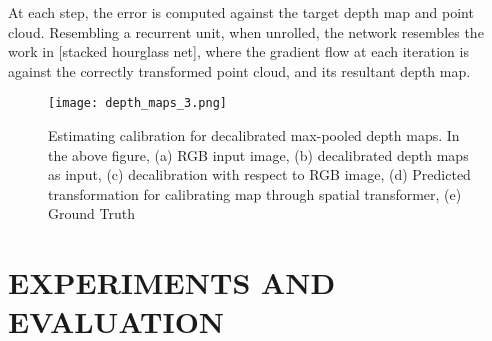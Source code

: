 \documentclass[letterpaper, 10 pt, conference]{ieeeconf}  %
\begin{document}
At each step, the error is computed against the target depth map and point cloud. Resembling a recurrent unit, when unrolled, the network resembles the work in [stacked hourglass net], where the gradient flow at each iteration is against the correctly transformed point cloud, and its resultant depth map. 

\begin{figure*}
\begin{center}
    \texttt{[image: depth\_maps\_3.png]}
\end{center}
    \caption{Estimating calibration for decalibrated max-pooled depth maps. In the above figure, (a) RGB input image, (b) decalibrated depth maps as input, (c) decalibration with respect to RGB image, (d) Predicted transformation for calibrating map through spatial transformer, (e) Ground Truth}
\label{fig:long}
\end{figure*}

\section{EXPERIMENTS AND EVALUATION}
\end{document}
